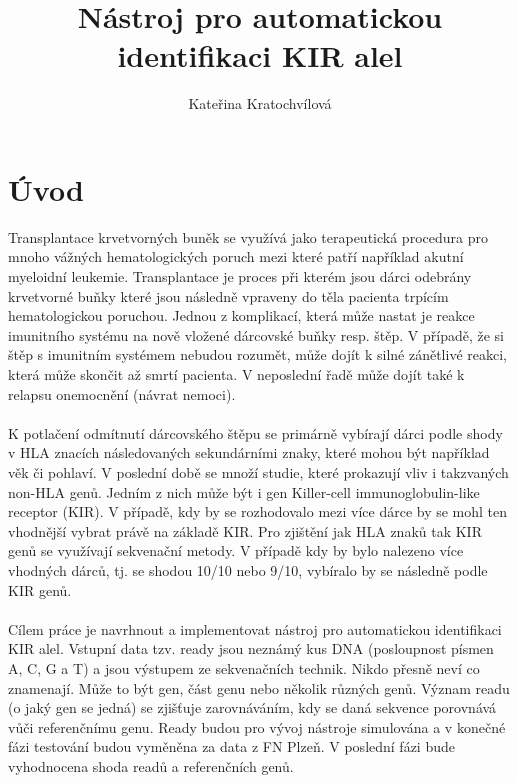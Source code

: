 \documentclass[czech,DP]{thesiskiv}
\author{Kateřina Kratochvílová}
\title{Nástroj pro automatickou identifikaci KIR alel}
\numberwithin{equation}{section}
\begin{document}
%
\maketitle
\tableofcontents

\chapter{Úvod}
Transplantace krvetvorných buněk se využívá jako terapeutická procedura pro mnoho vážných hematologických poruch mezi které patří například akutní myeloidní leukemie. Transplantace je proces při kterém jsou dárci odebrány krvetvorné buňky které jsou následně vpraveny do těla pacienta trpícím hematologickou poruchou. Jednou z komplikací, která může nastat je reakce imunitního systému na nově vložené dárcovské buňky resp. štěp. V případě, že si štěp s imunitním systémem nebudou rozumět, může dojít k silné zánětlivé reakci, která může skončit až smrtí pacienta. V neposlední řadě může dojít také k relapsu onemocnění (návrat nemoci). 
\\
\\
K potlačení odmítnutí dárcovského štěpu se primárně vybírají dárci podle shody v HLA znacích následovaných sekundárními znaky, které mohou být například věk či pohlaví. V poslední době se množí studie, které prokazují vliv i takzvaných non-HLA genů. Jedním z nich může být i gen Killer-cell immunoglobulin-like receptor (KIR). V případě, kdy by se rozhodovalo mezi více dárce by se mohl ten vhodnější vybrat právě na základě KIR. Pro zjištění jak HLA znaků tak KIR genů se využívají sekvenační metody. V případě kdy by bylo nalezeno více vhodných dárců, tj. se shodou 10/10 nebo 9/10, vybíralo by se následně podle KIR genů. \cite{KIR_transplantace_jindra} \cite{Frycova_bakalarka}
\\
\\
Cílem práce je navrhnout a implementovat nástroj pro automatickou identifikaci KIR alel. Vstupní data tzv. ready jsou neznámý kus DNA (posloupnost písmen A, C, G a T) a jsou výstupem ze sekvenačních technik. Nikdo přesně neví co znamenají. Může to být gen, část genu nebo několik různých genů. Význam readu (o jaký gen se jedná) se zjišťuje zarovnáváním, kdy se daná sekvence porovnává vůči referenčnímu genu. Ready budou pro vývoj nástroje simulována a v konečné fázi testování budou vyměněna za data z FN Plzeň. V poslední fázi bude vyhodnocena shoda readů a referenčních genů.
\end{document}
